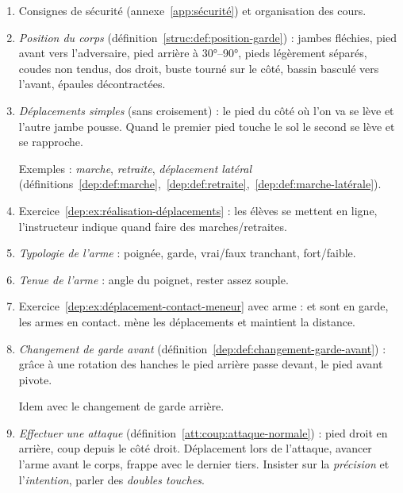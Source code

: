 \begin{enumerate}
	\item Consignes de sécurité (annexe~\ref{app:sécurité}) et organisation des cours.
	
	\item \emph{Position du corps} (définition~\ref{struc:def:position-garde}) : jambes fléchies, pied avant vers l'adversaire, pied arrière à \ang{30}--\ang{90}, pieds légèrement séparés, coudes non tendus, dos droit, buste tourné sur le côté, bassin basculé vers l'avant, épaules décontractées.
	
	\item \emph{Déplacements simples} (sans croisement) : le pied du côté où l'on va se lève et l'autre jambe pousse.
	Quand le premier pied touche le sol le second se lève et se rapproche.
	
	Exemples : \emph{marche}, \emph{retraite}, \emph{déplacement latéral} (définitions~\ref{dep:def:marche},~\ref{dep:def:retraite},~\ref{dep:def:marche-latérale}).
	
	\item Exercice~\ref{dep:ex:réalisation-déplacements} : les élèves se mettent en ligne, l'instructeur indique quand faire des marches/retraites.

	\item \emph{Typologie de l'arme} : poignée, garde, vrai/faux tranchant, fort/faible.
	
	\item \emph{Tenue de l'arme} : angle du poignet, rester assez souple.
	
	\item Exercice~\ref{dep:ex:déplacement-contact-meneur} avec arme : \A et \D sont en garde, les armes en contact.
	\A mène les déplacements et \D maintient la distance.
	
	\item \emph{Changement de garde avant} (définition~\ref{dep:def:changement-garde-avant}) : grâce à une rotation des hanches le pied arrière passe devant, le pied avant pivote.
	
	Idem avec le changement de garde arrière.
	

	
	\item \emph{Effectuer une attaque} (définition~\ref{att:coup:attaque-normale}) : pied droit en arrière, coup depuis le côté droit.
	Déplacement lors de l'attaque, avancer l'arme avant le corps, frappe avec le dernier tiers.
	Insister sur la \emph{précision} et l'\emph{intention}, parler des \emph{doubles touches}.
	

\end{enumerate}
